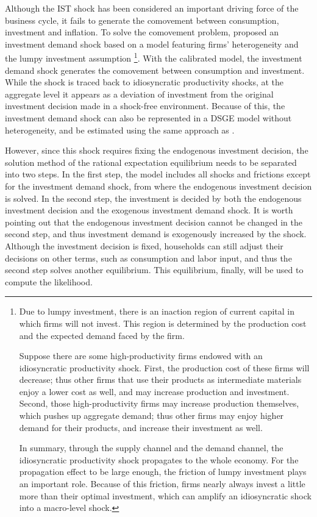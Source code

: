 Although the IST shock has been considered an important driving force of the business cycle, it fails to generate the comovement between consumption, investment and inflation. To solve the comovement problem, \cite{nireiOriginsPropagationAnimal} proposed an investment demand shock based on a model featuring firms' heterogeneity and the lumpy investment assumption \footnote{Due to lumpy investment, there is an inaction region of current capital in which firms will not invest. This region is determined by the production cost and the expected demand faced by the firm.

Suppose there are some high-productivity firms endowed with an idiosyncratic productivity shock. First, the production cost of these firms will decrease; thus other firms that use their products as intermediate materials enjoy a lower cost as well, and may increase production and investment. Second, those high-productivity firms may increase production themselves, which pushes up aggregate demand; thus other firms may enjoy higher demand for their products, and increase their investment as well.

In summary, through the supply channel and the demand channel, the idiosyncratic productivity shock propagates to the whole economy. For the propagation effect to be large enough, the friction of lumpy investment plays an important role. Because of this friction, firms nearly always invest a little more than their optimal investment, which can amplify an idiosyncratic shock into a macro-level shock.}. With the calibrated model, the investment demand shock generates the comovement between consumption and investment. While the shock is traced back to idiosyncratic productivity shocks, at the aggregate level it appears as a deviation of investment from the original investment decision made in a shock-free environment. Because of this, the investment demand shock can also be represented in a DSGE model without heterogeneity, and be estimated using the same approach as \cite{smetsShocksFrictionsUS2007}.

However, since this shock requires fixing the endogenous investment decision, the solution method of the rational expectation equilibrium needs to be separated into two steps. In the first step, the model includes all shocks and frictions except for the investment demand shock, from where the endogenous investment decision is solved. In the second step, the investment is decided by both the endogenous investment decision and the exogenous investment demand shock. It is worth pointing out that the endogenous investment decision cannot be changed in the second step, and thus investment demand is exogenously increased by the shock. Although the investment decision is fixed, households can still adjust their decisions on other terms, such as consumption and labor input, and thus the second step solves another equilibrium. This equilibrium, finally, will be used to compute the likelihood.

